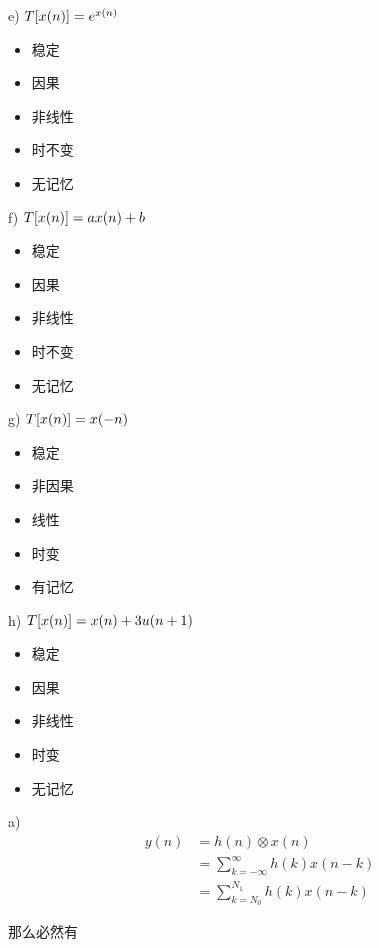 \documentclass[lang=cn,11pt,a4paper,cite=authoryear]{elegantpaper}
\begin{document}
\begin{multicols*}{2}
    e) \({T}[x(n)] = e^{x(n)}\)

    \begin{itemize}
        \item 稳定
        \item 因果
        \item 非线性
        \item 时不变
        \item 无记忆
    \end{itemize}

    f) \({T}[x(n)] = ax(n) + b\) 

    \begin{itemize}
        \item 稳定
        \item 因果
        \item 非线性
        \item 时不变
        \item 无记忆
    \end{itemize}

    g) \({T}[x(n)] = x(-n)\)

    \begin{itemize}
        \item 稳定
        \item 非因果
        \item 线性
        \item 时变
        \item 有记忆
    \end{itemize}

    h) \({T}[x(n)] = x(n) + 3 u(n+1)\)

    \begin{itemize}
        \item 稳定
        \item 因果
        \item 非线性
        \item 时变
        \item 无记忆
    \end{itemize}


a)  \[\begin{aligned}
    y(n) &= h(n) \otimes x(n) \\ 
    &= \sum_{k=-\infty}^{\infty} h(k) x(n-k) \\
    &= \sum_{k=N_0}^{N_1} h(k) x(n-k)
\end{aligned}\]

那么必然有 


\end{multicols*}
\end{document}

